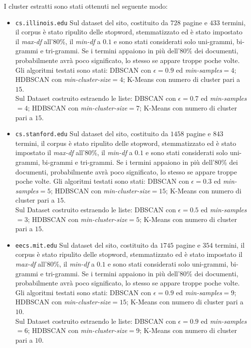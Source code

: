 I cluster estratti sono stati ottenuti nel seguente modo:
\begin{itemize}
\item \texttt{cs.illinois.edu}
Sul dataset del sito, costituito da $728$ pagine e $433$ termini, il corpus è stato ripulito delle stopword, stemmatizzato ed è stato impostato il \textit{max-df} all'80\%, il \textit{min-df} a $0.1$ e sono stati considerati solo uni-grammi, bi-grammi e tri-grammi. Se i termini appaiono in più dell'80\% dei documenti, probabilmente avrà poco significato, lo stesso se appare troppe poche volte. Gli algoritmi testati sono stati: DBSCAN con $\epsilon = 0.9$ ed \textit{min-samples}$ = 4$; HDBSCAN con \textit{min-cluster-size}$=4$; K-Means con numero di cluster pari a $15$. \\Sul Dataset costruito estraendo le liste: DBSCAN con $\epsilon = 0.7$ ed \textit{min-samples}$ = 4$; HDBSCAN con \textit{min-cluster-size}$=7$; K-Means con numero di cluster pari a $15$. 
\item \texttt{cs.stanford.edu}
Sul dataset del sito, costituito da $1458$ pagine e $843$ termini, il corpus è stato ripulito delle stopword, stemmatizzato ed è stato impostato il \textit{max-df} all'80\%, il \textit{min-df} a $0.1$ e sono stati considerati solo uni-grammi, bi-grammi e tri-grammi. Se i termini appaiono in più dell'80\% dei documenti, probabilmente avrà poco significato, lo stesso se appare troppe poche volte. Gli algoritmi testati sono stati: DBSCAN con $\epsilon = 0.3$ ed \textit{min-samples}$ = 5$; HDBSCAN con \textit{min-cluster-size}$=15$; K-Means con numero di cluster pari a $15$. \\Sul Dataset costruito estraendo le liste: DBSCAN con $\epsilon = 0.5$ ed \textit{min-samples}$ = 3$; HDBSCAN con \textit{min-cluster-size}$=5$; K-Means con numero di cluster pari a $15$. 
\item \texttt{eecs.mit.edu}
Sul dataset del sito, costituito da $1745$ pagine e $354$ termini, il corpus è stato ripulito delle stopword, stemmatizzato ed è stato impostato il \textit{max-df} all'80\%, il \textit{min-df} a $0.1$ e sono stati considerati solo uni-grammi, bi-grammi e tri-grammi. Se i termini appaiono in più dell'80\% dei documenti, probabilmente avrà poco significato, lo stesso se appare troppe poche volte. Gli algoritmi testati sono stati: DBSCAN con $\epsilon = 0.9$ ed \textit{min-samples}$ = 9$; HDBSCAN con \textit{min-cluster-size}$=15$; K-Means con numero di cluster pari a $10$. \\Sul Dataset costruito estraendo le liste: DBSCAN con $\epsilon = 0.9$ ed \textit{min-samples}$ = 6$; HDBSCAN con \textit{min-cluster-size}$=9$; K-Means con numero di cluster pari a $10$. 

\end{itemize}
